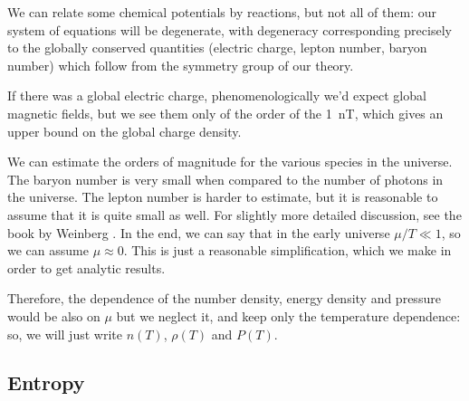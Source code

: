 \documentclass[main.tex]{subfiles}
\begin{document}
%
%



We can relate some chemical potentials by reactions, but not all of them: our system of equations will be degenerate, with degeneracy corresponding precisely to the globally conserved quantities (electric charge, lepton number, baryon number) which follow from the symmetry group of our theory.

If there was a global electric charge, phenomenologically we'd expect global magnetic fields, but we see them only of the order of the \SI{1}{nT}, which gives an upper bound on the global charge density.

We can estimate the orders of magnitude for the various species in the universe.
The baryon number is very small when compared to the number of photons in the universe. The lepton number is harder to estimate, but it is reasonable to assume that it is quite small as well. For slightly more detailed discussion, see the book by Weinberg \cite[before eq. 15.6.5]{weinbergGravitationCosmologyPrinciples1972}.
In the end, we can say that in the early universe \(\mu / T \ll 1\), so we can assume \(\mu \approx 0\).
This is just a reasonable simplification, which we make in order to get analytic results. 

Therefore, the dependence of the number density, energy density and pressure would be also on \(\mu \) but we neglect it, and keep only the temperature dependence: so, we will just write \(n(T)\), \(\rho (T)\) and \(P(T)\).


\subsection{Entropy}
\end{document}
